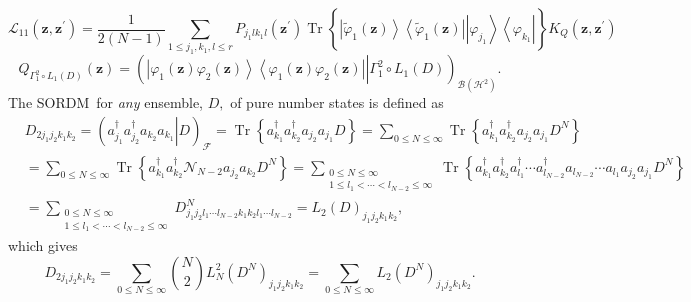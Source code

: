 \documentclass[aps,preprint]{revtex4}%
\begin{document}
%

\begin{equation}
\mathcal{L}_{11}\left(  \mathbf{z,z}^{\prime}\right)  =\frac{1}{2\left(
N-1\right)  }\sum_{1\leq j_{1},k_{1},l\leq r}P_{j_{1}lk_{1}l}\left(
\mathbf{z}^{\prime}\right)  \operatorname*{Tr}\left\{  \left\vert
\tilde{\varphi}_{1}\left(  \mathbf{z}\right)  \right\rangle \left\langle
\tilde{\varphi}_{1}\left(  \mathbf{z}\right)  \right\vert
\overset{}{\left\vert \varphi_{j_{1}}\right\rangle \left\langle \varphi
_{k_{1}}\right\vert }\right\}  K_{Q}\left(  \mathbf{z,z}^{\prime}\right)
\end{equation}%
\begin{equation}
Q_{\Gamma_{1}^{2}\circ L_{1}\left(  D\right)  }\left(  \mathbf{z}\right)
=\left(  \left.  \overset{}{\left\vert \varphi_{1}\left(  \mathbf{z}\right)
\varphi_{2}\left(  \mathbf{z}\right)  \right\rangle \left\langle \varphi
_{1}\left(  \mathbf{z}\right)  \varphi_{2}\left(  \mathbf{z}\right)
\right\vert }\right\vert \Gamma_{1}^{2}\circ L_{1}\left(  D\right)  \right)
_{\mathcal{B}\left(  \mathcal{H}^{2}\right)  }.
\end{equation}
The SORDM\ for \emph{any }ensemble, $D,$ of pure number states is defined as
\begin{align}
&  D_{2j_{1}j_{2}k_{1}k_{2}}=\left(  \left.  a_{j_{1}}^{\dagger}a_{j_{2}%
}^{\dagger}a_{k_{2}}a_{k_{1}}\right\vert D\right)  _{\mathcal{F}%
}=\operatorname{Tr}\left\{  a_{k_{1}}^{\dagger}a_{k_{2}}^{\dagger}a_{j_{2}%
}a_{j_{1}}D\right\}  =\sum_{0\leq N\leq\infty}\operatorname{Tr}\left\{
a_{k_{1}}^{\dagger}a_{k_{2}}^{\dagger}a_{j_{2}}a_{j_{1}}D^{N}\right\}
\nonumber\\
&  =\sum_{0\leq N\leq\infty}\operatorname{Tr}\left\{  a_{k_{1}}^{\dagger
}a_{k_{2}}^{\dagger}\mathcal{N}_{N-2}a_{j_{2}}a_{k_{2}}D^{N}\right\}
=\sum_{\substack{0\leq N\leq\infty\\1\leq l_{1}<\cdots<l_{N-2}\leq\infty
}}\operatorname{Tr}\left\{  a_{k_{1}}^{\dagger}a_{k_{2}}^{\dagger}a_{l_{1}%
}^{\dagger}\cdots a_{l_{N-2}}^{\dagger}a_{l_{N-2}}\cdots a_{l_{1}}a_{j_{2}%
}a_{j_{1}}D^{N}\right\}  \nonumber\\
&  =\sum_{\substack{0\leq N\leq\infty\\1\leq l_{1}<\cdots<l_{N-2}\leq\infty
}}D_{j_{1}j_{2}l_{1}\cdots l_{N-2}k_{1}k_{2}l_{1}\cdots l_{N-2}}^{N}%
=L_{2}\left(  D\right)  _{j_{1}j_{2}k_{1}k_{2}},
\end{align}
which gives%
\begin{equation}
D_{2j_{1}j_{2}k_{1}k_{2}}=\sum_{0\leq N\leq\infty}\binom{N}{2}L_{N}^{2}\left(
D^{N}\right)  _{j_{1}j_{2}k_{1}k_{2}}=\sum_{0\leq N\leq\infty}L_{2}\left(
D^{N}\right)  _{j_{1}j_{2}k_{1}k_{2}}.
\end{equation}
\end{document}
